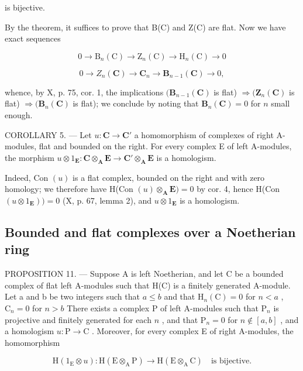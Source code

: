 is bijective.

By the theorem, it suffices to prove that B(C) and Z(C) are flat. Now we have exact sequences

\[
0 \to \mathrm{B} _ {n} (\mathrm{C}) \to \mathrm{Z} _ {n} (\mathrm{C}) \to \mathrm{H} _ {n} (\mathrm{C}) \to 0
\]

\[
0 \to Z _ {n} (\mathbf {C}) \to \mathbf {C} _ {n} \to \mathbf {B} _ {n - 1} (\mathbf {C}) \to 0,
\]

whence, by X, p. 75, cor. 1, the implications \((\mathbf{B}_{n-1}(\mathbf{C})\) is flat) \(\Rightarrow (\mathbf{Z}_n(\mathbf{C})\) is flat) \(\Rightarrow (\mathbf{B}_n(\mathbf{C})\) is flat); we conclude by noting that \(\mathbf{B}_n(\mathbf{C}) = 0\) for \(n\) small enough.

COROLLARY 5. --- Let \(u: \mathbf{C} \to \mathbf{C}'\) a homomorphism of complexes of right A-modules, flat and bounded on the right. For every complex E of left A-modules, the morphism \(u \otimes 1_{\mathbf{E}}: \mathbf{C} \otimes_{\mathbf{A}} \mathbf{E} \to \mathbf{C}' \otimes_{\mathbf{A}} \mathbf{E}\) is a homologism.

Indeed, Con \((u)\) is a flat complex, bounded on the right and with zero homology; we therefore have H(Con \((u) \otimes_{\mathbf{A}} \mathbf{E}) = 0\) by cor. 4, hence H(Con \((u \otimes 1_{\mathbf{E}})) = 0\) (X, p. 67, lemma 2), and \(u \otimes 1_{\mathbf{E}}\) is a homologism.

\subsection{Bounded and flat complexes over a Noetherian ring}

PROPOSITION 11. --- Suppose A is left Noetherian, and let C be a bounded complex of flat left A-modules such that H(C) is a finitely generated A-module. Let a and b be two integers such that \(a \leqslant b\) and that \(\mathrm{H}_{n}(\mathrm{C}) = 0\) for \(n < a\) , \(\mathrm{C}_{n} = 0\) for \(n > b\) There exists a complex P of left A-modules such that \(\mathrm{P}_{n}\) is projective and finitely generated for each \(n\) , and that \(\mathrm{P}_{n} = 0\) for \(n \notin [a, b]\) , and a homologism \(u: \mathrm{P} \to \mathrm{C}\) . Moreover, for every complex E of right A-modules, the homomorphism

\[
\mathrm{H} \left(1 _ {\mathrm{E}} \otimes u\right): \mathrm{H} (\mathrm{E} \otimes_ {\mathrm{A}} \mathrm{P}) \rightarrow \mathrm{H} (\mathrm{E} \otimes_ {\mathrm{A}} \mathrm{C}) \quad \text{is bijective.}
\]

